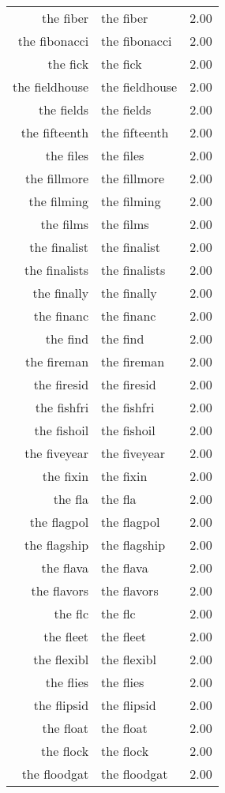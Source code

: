 \begin{table}[ht]
\begin{tabular}{rlr}
  the fiber & the fiber & 2.00 \\ 
  the fibonacci & the fibonacci & 2.00 \\ 
  the fick & the fick & 2.00 \\ 
  the fieldhouse & the fieldhouse & 2.00 \\ 
  the fields & the fields & 2.00 \\ 
  the fifteenth & the fifteenth & 2.00 \\ 
  the files & the files & 2.00 \\ 
  the fillmore & the fillmore & 2.00 \\ 
  the filming & the filming & 2.00 \\ 
  the films & the films & 2.00 \\ 
  the finalist & the finalist & 2.00 \\ 
  the finalists & the finalists & 2.00 \\ 
  the finally & the finally & 2.00 \\ 
  the financ & the financ & 2.00 \\ 
  the find & the find & 2.00 \\ 
  the fireman & the fireman & 2.00 \\ 
  the firesid & the firesid & 2.00 \\ 
  the fishfri & the fishfri & 2.00 \\ 
  the fishoil & the fishoil & 2.00 \\ 
  the fiveyear & the fiveyear & 2.00 \\ 
  the fixin & the fixin & 2.00 \\ 
  the fla & the fla & 2.00 \\ 
  the flagpol & the flagpol & 2.00 \\ 
  the flagship & the flagship & 2.00 \\ 
  the flava & the flava & 2.00 \\ 
  the flavors & the flavors & 2.00 \\ 
  the flc & the flc & 2.00 \\ 
  the fleet & the fleet & 2.00 \\ 
  the flexibl & the flexibl & 2.00 \\ 
  the flies & the flies & 2.00 \\ 
  the flipsid & the flipsid & 2.00 \\ 
  the float & the float & 2.00 \\ 
  the flock & the flock & 2.00 \\ 
  the floodgat & the floodgat & 2.00 \\ 

\end{tabular}
\end{table}
